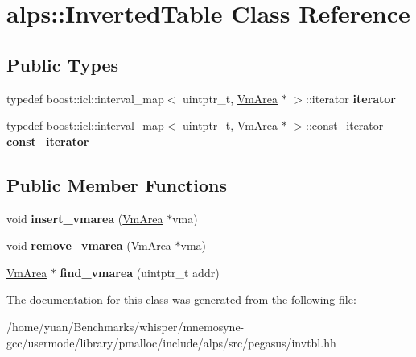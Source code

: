 \hypertarget{classalps_1_1InvertedTable}{}\section{alps\+:\+:Inverted\+Table Class Reference}
\label{classalps_1_1InvertedTable}
\subsection*{Public Types}
\begin{DoxyCompactItemize}
\item 
typedef boost\+::icl\+::interval\+\_\+map$<$ uintptr\+\_\+t, \hyperlink{classalps_1_1VmArea}{Vm\+Area} $\ast$ $>$\+::iterator {\bfseries iterator}\hypertarget{classalps_1_1InvertedTable_a0d56f680d81c95452ca5bf832951c8b4}{}\label{classalps_1_1InvertedTable_a0d56f680d81c95452ca5bf832951c8b4}

\item 
typedef boost\+::icl\+::interval\+\_\+map$<$ uintptr\+\_\+t, \hyperlink{classalps_1_1VmArea}{Vm\+Area} $\ast$ $>$\+::const\+\_\+iterator {\bfseries const\+\_\+iterator}\hypertarget{classalps_1_1InvertedTable_a9a06119f1dd942d848a4aeeb714299bf}{}\label{classalps_1_1InvertedTable_a9a06119f1dd942d848a4aeeb714299bf}

\end{DoxyCompactItemize}
\subsection*{Public Member Functions}
\begin{DoxyCompactItemize}
\item 
void {\bfseries insert\+\_\+vmarea} (\hyperlink{classalps_1_1VmArea}{Vm\+Area} $\ast$vma)\hypertarget{classalps_1_1InvertedTable_a150d7e953eb58dd2bee2e875cc2b8dd5}{}\label{classalps_1_1InvertedTable_a150d7e953eb58dd2bee2e875cc2b8dd5}

\item 
void {\bfseries remove\+\_\+vmarea} (\hyperlink{classalps_1_1VmArea}{Vm\+Area} $\ast$vma)\hypertarget{classalps_1_1InvertedTable_afa7d0b7fd8c29ac0f3936c9bfb393e35}{}\label{classalps_1_1InvertedTable_afa7d0b7fd8c29ac0f3936c9bfb393e35}

\item 
\hyperlink{classalps_1_1VmArea}{Vm\+Area} $\ast$ {\bfseries find\+\_\+vmarea} (uintptr\+\_\+t addr)\hypertarget{classalps_1_1InvertedTable_a161c2ce7a70ee057148e3c18cfd069d2}{}\label{classalps_1_1InvertedTable_a161c2ce7a70ee057148e3c18cfd069d2}

\end{DoxyCompactItemize}


The documentation for this class was generated from the following file\+:\begin{DoxyCompactItemize}
\item 
/home/yuan/\+Benchmarks/whisper/mnemosyne-\/gcc/usermode/library/pmalloc/include/alps/src/pegasus/invtbl.\+hh\end{DoxyCompactItemize}
